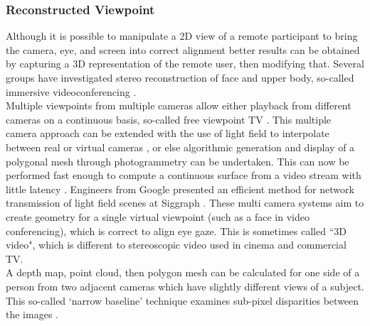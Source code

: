 \subsubsection{Reconstructed Viewpoint}
Although it is possible to manipulate a 2D view of a remote participant to bring the camera, eye, and screen into correct alignment better results can be obtained by capturing a 3D representation of the remote user, then modifying that. Several groups have investigated stereo reconstruction of face and upper body, so-called immersive videoconferencing \cite{Atzpadin2004}. \\                   Multiple viewpoints from multiple cameras allow either playback from different cameras on a continuous basis, so-called free viewpoint TV \cite{Zhang2007}. This multiple camera approach can be extended with the use of light field to interpolate between real or virtual cameras \cite{Ott1993, Al-Saidi2009}, or else algorithmic generation and display of a polygonal mesh through photogrammetry can be undertaken. This can now be performed fast enough to compute a continuous surface from a video stream with little latency \cite{Criminisi:2003ji}. 
Engineers from Google presented an efficient method for network transmission of light field scenes at Siggraph \cite{broxton2020immersive}.
These multi camera systems aim to create geometry for a single virtual viewpoint (such as a face in video conferencing), which is correct to align eye gaze. This is sometimes called ``3D video", which is different to stereoscopic video used in cinema and commercial TV.\\
 A depth map, point cloud, then polygon mesh can be calculated for one side of a person from two adjacent cameras which have slightly different views of a subject.  This so-called `narrow baseline' technique examines sub-pixel disparities between the images \cite{Knoblauch2008}. \\

